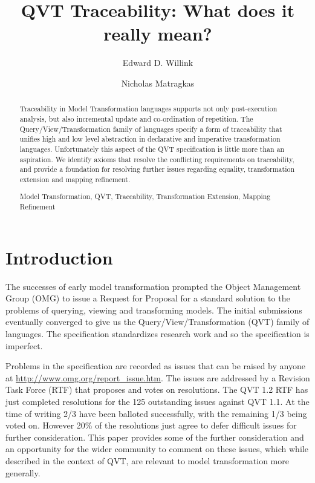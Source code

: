 \documentclass[runningheads,a4paper]{llncs}
\newcommand{\keywords}[1]{\par\addvspace\baselineskip
\noindent\keywordname\enspace\ignorespaces#1}
\begin{document}
\mainmatter

\title{QVT Traceability: What does it really mean?}


\author{Edward D. Willink
\and Nicholas Matragkas}


\maketitle


\begin{abstract}


Traceability in Model Transformation languages supports not only post-execution analysis, but also incremental update and co-ordination of repetition. The Query/View/Transformation family of languages specify a form of traceability that unifies high and low level abstraction in declarative and imperative transformation languages. Unfortunately this aspect of the QVT specification is little more than an aspiration. We identify axioms that resolve the conflicting requirements on traceability, and provide a foundation for resolving further issues regarding equality, transformation extension and mapping refinement.
\keywords{Model Transformation, QVT, Traceability, Transformation Extension, Mapping Refinement}
\end{abstract}


\section{Introduction}

The successes of early model transformation prompted the Object Management Group (OMG) to issue a Request for Proposal for a standard solution to the problems of querying, viewing and transforming models. The initial submissions eventually converged to give us the Query/View/Transformation (QVT) family of languages. The specification standardizes research work and so the specification is imperfect.

Problems in the specification are recorded as issues that can be raised by anyone at \url{http://www.omg.org/report_issue.htm}. The issues are addressed by a Revision Task Force (RTF) that proposes and votes on resolutions. The QVT 1.2 RTF has just completed resolutions for the 125 outstanding issues against QVT 1.1\cite{QVT-1.1}. At the time of writing 2/3 have been balloted successfully, with the remaining 1/3 being voted on. However 20\% of the resolutions just agree to defer difficult issues for further consideration. This paper provides some of the further consideration and an opportunity for the wider community to comment on these issues, which while described in the context of QVT, are relevant to model transformation more generally.
\end{document}
